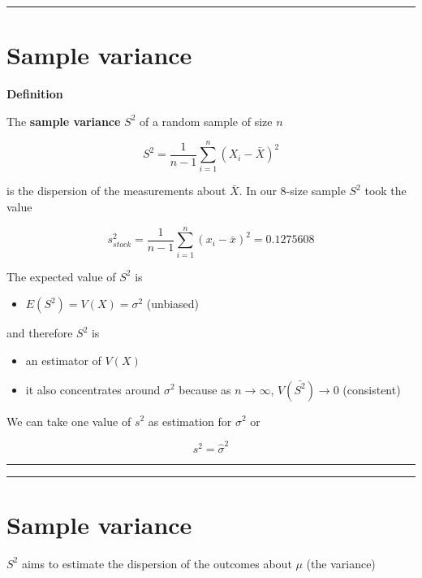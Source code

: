 \documentclass[
]{book}
\providecommand{\tightlist}{%
  \setlength{\itemsep}{0pt}\setlength{\parskip}{0pt}}
\begin{document}
\begin{center}\rule{0.5\linewidth}{0.5pt}\end{center}

\hypertarget{sample-variance-2}{%
\section{Sample variance}\label{sample-variance-2}}

\textbf{Definition}

The \textbf{sample variance} \(S^2\) of a random sample of size \(n\)

\[S^2= \frac{1}{n-1}\sum_{i=1}^n (X_i-\bar{X})^2\]

is the dispersion of the measurements about \(\bar{X}\). In our \(8\)-size sample \(S^2\) took the value

\[s_{stock}^2=\frac{1}{n-1}\sum_{i=1}^n (x_i-\bar{x})^2=0.1275608\]

The expected value of \(S^2\) is

\begin{itemize}
\tightlist
\item
  \(E(S^2)=V(X)=\sigma^2\) (unbiased)
\end{itemize}

and therefore \(S^2\) is

\begin{itemize}
\tightlist
\item
  an estimator of \(V(X)\)
\item
  it also concentrates around \(\sigma^2\) because as \(n \rightarrow \infty\), \(V(\bar{S^2}) \rightarrow 0\) (consistent)
\end{itemize}

We can take one value of \(s^2\) as estimation for \(\sigma^2\) or

\[s^2=\hat{\sigma}^2\]

\begin{center}\rule{0.5\linewidth}{0.5pt}\end{center}

\begin{center}\rule{0.5\linewidth}{0.5pt}\end{center}

\hypertarget{sample-variance-3}{%
\section{Sample variance}\label{sample-variance-3}}

\(S^2\) aims to estimate the dispersion of the outcomes about \(\mu\) (the variance)
\end{document}
